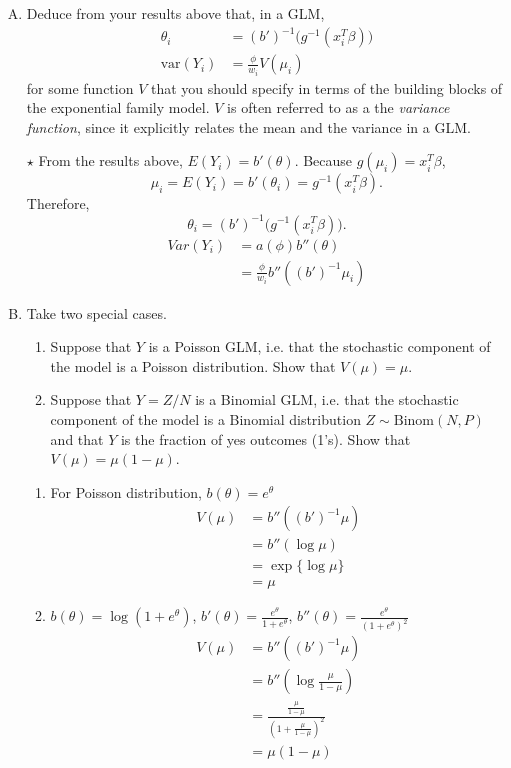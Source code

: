 \documentclass[11pt]{article}
\newcommand{\jie}{$\star$ }
\begin{document}
\begin{enumerate}[(A)]

\item Deduce from your results above that, in a GLM,
 $$
\begin{aligned}
\theta_i &= (b')^{-1} \Big( g^{-1}(x_i^T \beta) \Big) \\
\mbox{var} (Y_i ) &= \frac{\phi}{w_i} V(\mu_i)
\end{aligned}
$$
for some function $V$ that you should specify in terms of the building blocks of the exponential family model.  $V$ is often referred to as a the \emph{variance function}, since it explicitly relates the mean and the variance in a GLM.  

\bigskip
\jie
From the results above, $E(Y_i) = b'(\theta)$. Because $g(\mu_i) = x_i^T\beta$,
$$\mu_i = E(Y_i) = b'(\theta_i) = g^{-1}(x_i^T\beta).$$
Therefore,
$$\theta_i = (b')^{-1} \Big( g^{-1}(x_i^T \beta) \Big).$$
\begin{align*}
    Var(Y_i) &= a(\phi)b''(\theta) \\
    &= \frac{\phi}{w_i} b''( (b')^{-1} \mu_i)
\end{align*}

\bigskip

\item Take two special cases.  
\begin{enumerate}[(1)]
\item Suppose that $Y$ is a Poisson GLM, i.e. that the stochastic component of the model is a Poisson distribution.  Show that $V(\mu) = \mu$.
\item Suppose that $Y = Z/N$ is a Binomial GLM, i.e. that the stochastic component of the model is a Binomial distribution $Z \sim \mbox{Binom}(N, P)$ and that $Y$ is the fraction of yes outcomes (1's).  Show that $V(\mu) = \mu(1-\mu)$.  
\end{enumerate}

\bigskip
\begin{enumerate}
    \item For Poisson distribution, $b(\theta) = e^\theta$
\begin{align*}
    V(\mu) &= b''( (b')^{-1} \mu)\\
    &=b''(\log \mu) \\
    &= \exp\{\log \mu\} \\
    &= \mu
\end{align*}

    \item $b(\theta) = \log(1+e^\theta)$, $b'(\theta) = \frac{e^\theta}{1+e^\theta}$, $b''(\theta) = \frac{e^\theta}{(1+e^\theta)^2}$
\begin{align*}
    V(\mu) &= b''( (b')^{-1} \mu)\\
    &=b''(\log \frac{\mu}{1-\mu}) \\
    &= \frac{\frac{\mu}{1-\mu}}{(1+\frac{\mu}{1-\mu})^2} \\
    &= \mu(1-\mu)
\end{align*}


\end{enumerate}
\end{enumerate}
\end{document}
